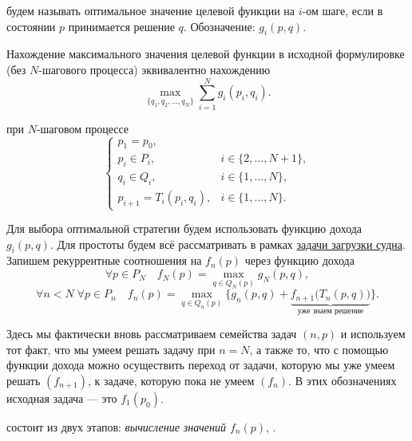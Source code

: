 будем называть оптимальное значение целевой функции на $i$-ом шаге, если в состоянии $p$ принимается решение $q$. Обозначение: $\boxed{g_i(p, q)}$.

\fact

Нахождение максимального значения целевой функции в исходной формулировке (без $N$-шагового процесса) эквивалентно нахождению
\[
\max_{\{q_1, q_2, \dots, q_N\}} \sum_{i=1}^{N} g_i(p_i, q_i).
\]

при $N$-шаговом процессе
\[
\begin{cases}
p_1 = p_0, \\	
p_i \in P_i, &i \in \{2, \dots, N+1\}, \\
q_i \in Q_i, &i \in \{1, \dots, N\}, \\
p_{i+1} = T_i(p_i, q_i), &i \in \{1, \dots, N\}.
\end{cases}
\]

\label{alg:opt_strategy}

Для выбора оптимальной стратегии будем использовать функцию дохода $g_i(p, q)$. Для простоты будем всё рассматривать в рамках \hyperref[pr:loading_vessel]{задачи загрузки судна}. Запишем рекуррентные соотношения на $f_n(p)$ через функцию дохода
\[
\forall p \in P_{N} \quad f_N(p) = \max_{q \in Q_{N}(p)} g_N(p, q),
\]
\[
\forall n < N \; \forall p \in P_n \quad f_n(p) = \max_{q \in Q_{n}(p)} \Big\{g_n(p, q) + \underbrace{f_{n+1}\big(T_{n}(p, q)\big)}_{\text{уже знаем решение}}\Big\}.
\]

Здесь мы фактически вновь рассматриваем семейства задач $(n, p)$ и используем тот факт, что мы умеем решать задачу при $n = N$, а также то, что с помощью функции дохода можно осуществить переход от задачи, которую мы уже умеем решать $(f_{n+1})$, к задаче, которую пока не умеем $(f_n)$. В этих обозначениях исходная задача --- это $f_1(p_0)$.

\underline{} состоит из двух этапов: \textit{вычисление значений $f_n(p)$}, .

